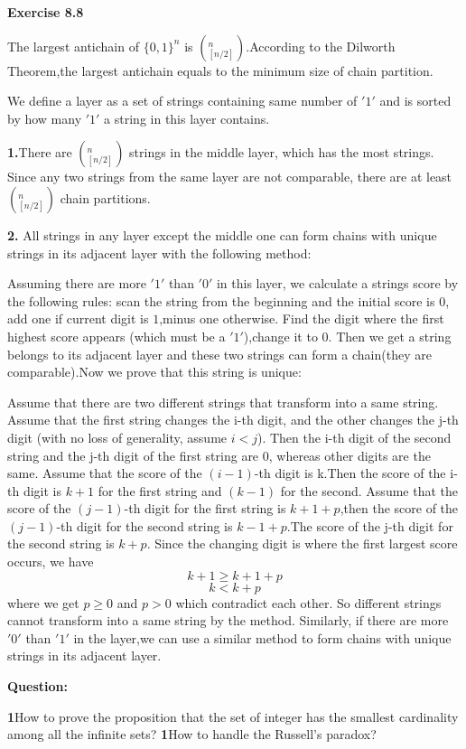 \documentclass{article} %
\begin{document}
	\textbf{Exercise 8.8}\par
	 The largest antichain of $\{0,1\}^n$ is $(_{[n/2]}^n)$.According to the Dilworth Theorem,the largest antichain equals to the minimum size of chain partition.\par
	 We define a layer as a set of strings containing same number of $'1'$ and is sorted by how many  $'1'$ a string in this layer contains.\par
	 \textbf{1.}There are $(_{[n/2]}^n)$ strings in the middle layer, which has the most strings. Since any two strings from the same layer are not comparable, there are at least $(_{[n/2]}^n)$ chain partitions.\par
	 \textbf{2.} All strings in any layer except the middle one can form chains with unique strings in its adjacent layer with the following method:\par
	 Assuming there are more $'1'$ than $'0'$ in this layer, we calculate a strings score by the following rules: scan the string from the beginning and the initial score is $0$, add one if current digit is $1$,minus one otherwise. Find the digit where the first highest score appears (which must be a $'1'$),change it to $0$. Then we get a string belongs to its adjacent layer and these two strings can form a chain(they are comparable).Now we prove that this string is unique:\par
	 Assume that there are two different strings that transform into a same string. Assume that the first string changes the i-th digit, and the other changes the j-th digit (with no loss of generality, assume $i<j$).  Then the i-th digit of the second string and the j-th digit of the first string are $0$, whereas other digits are the same. Assume that the score of the $(i-1)$-th digit is k.Then the score of the i-th digit is $k+1$ for the first string and $(k-1)$ for the second. Assume that the score of the $(j-1)$-th digit for the first string is $k+1+p$,then the score of the $(j-1)$-th digit for the second string is $k-1+p$.The score of the j-th digit for the second string is $k+p$. Since the changing digit is where the first largest score occurs, we have
	 $$
	 k+1 \ge k+1+p
	 $$
	 $$
	 k<k+p
	 $$
	 where we get $p\geq 0$ and $p>0$ which contradict each other. So  different strings cannot transform into a same string by the method. Similarly, if there are more $'0'$ than $'1'$ in the layer,we can use a similar method to form chains with unique strings in its adjacent layer.
	
	\textbf{Question:}\par
	\textbf{1}How to prove the proposition that the set of integer has the smallest cardinality among all the infinite sets?
	\textbf{1}How to handle the Russell's paradox?
	
\end{document}
